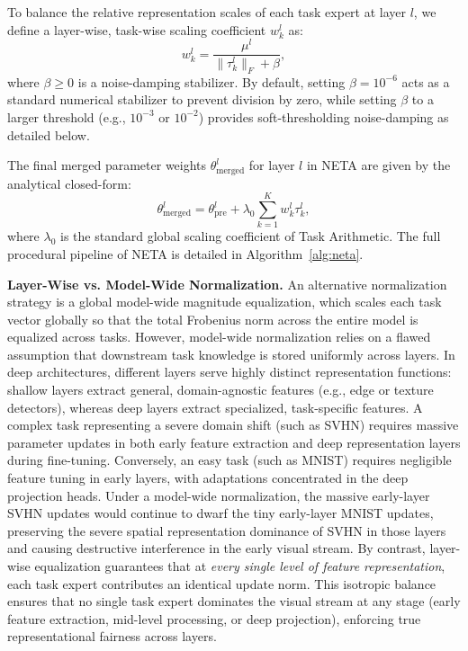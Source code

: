 To balance the relative representation scales of each task expert at layer $l$, we define a layer-wise, task-wise scaling coefficient $w_k^l$ as:
\begin{equation}
\label{eq:neta_weight}
w_k^l = \frac{\mu^l}{\|\tau_k^l\|_F + \beta},
\end{equation}
where $\beta \ge 0$ is a noise-damping stabilizer. By default, setting $\beta = 10^{-6}$ acts as a standard numerical stabilizer to prevent division by zero, while setting $\beta$ to a larger threshold (e.g., $10^{-3}$ or $10^{-2}$) provides soft-thresholding noise-damping as detailed below.

The final merged parameter weights $\theta_{\text{merged}}^l$ for layer $l$ in NETA are given by the analytical closed-form:
\begin{equation}
\label{eq:neta_merge}
\theta_{\text{merged}}^l = \theta_{\text{pre}}^l + \lambda_0 \sum_{k=1}^K w_k^l \tau_k^l,
\end{equation}
where $\lambda_0$ is the standard global scaling coefficient of Task Arithmetic. The full procedural pipeline of NETA is detailed in Algorithm~\ref{alg:neta}.

\textbf{Layer-Wise vs. Model-Wide Normalization.} 
An alternative normalization strategy is a global model-wide magnitude equalization, which scales each task vector globally so that the total Frobenius norm across the entire model is equalized across tasks. 
However, model-wide normalization relies on a flawed assumption that downstream task knowledge is stored uniformly across layers. 
In deep architectures, different layers serve highly distinct representation functions: shallow layers extract general, domain-agnostic features (e.g., edge or texture detectors), whereas deep layers extract specialized, task-specific features. 
A complex task representing a severe domain shift (such as SVHN) requires massive parameter updates in both early feature extraction and deep representation layers during fine-tuning. 
Conversely, an easy task (such as MNIST) requires negligible feature tuning in early layers, with adaptations concentrated in the deep projection heads. 
Under a model-wide normalization, the massive early-layer SVHN updates would continue to dwarf the tiny early-layer MNIST updates, preserving the severe spatial representation dominance of SVHN in those layers and causing destructive interference in the early visual stream. 
By contrast, layer-wise equalization guarantees that at \textit{every single level of feature representation}, each task expert contributes an identical update norm. 
This isotropic balance ensures that no single task expert dominates the visual stream at any stage (early feature extraction, mid-level processing, or deep projection), enforcing true representational fairness across layers.

